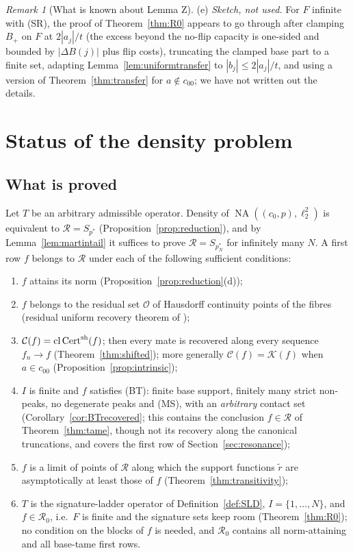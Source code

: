 \documentclass[10pt]{amsart}
\theoremstyle{definition}
\theoremstyle{remark}
\newtheorem{remark}[theorem]{Remark}
\newcommand{\NA}{\operatorname{NA}}
\newcommand{\Cset}{\mathcal C}
\newcommand{\Cert}{\operatorname{Cert}}
\newcommand{\cl}{\operatorname{cl}}
\newcommand{\Rec}{\mathcal R}
\begin{document}
\begin{remark}[What is known about Lemma Z]
(e) \emph{Sketch, not used.}  For $F$ infinite with (SR), the proof of
Theorem~\ref{thm:R0} appears to go through after clamping $B_+$ on $F$ at
$2|a_j|/t$ (the excess beyond the no-flip capacity is one-sided and bounded
by $|\Delta B(j)|$ plus flip costs), truncating the clamped base part to a
finite set, adapting Lemma~\ref{lem:uniformtransfer} to $|b_j|\le2|a_j|/t$,
and using a version of Theorem~\ref{thm:transfer} for $a\notin c_{00}$; we
have not written out the details.
\end{remark}

\section{Status of the density problem}\label{sec:status}

\subsection{What is proved}
Let $T$ be an arbitrary admissible operator.  Density of
$\NA((c_0,p),\ell_2^2)$ is equivalent to $\Rec=S_{p^*}$
(Proposition~\ref{prop:reduction}), and by Lemma~\ref{lem:martintail} it
suffices to prove $\Rec=S_{p_N^*}$ for infinitely many $N$.  A first row
$f$ belongs to $\Rec$ under each of the following sufficient conditions:
\begin{enumerate}
\item[(S1)] $f$ attains its norm (Proposition~\ref{prop:reduction}(d));
\item[(S2)] $f$ belongs to the residual set $\mathcal O$ of Hausdorff continuity
points of the fibres (residual uniform recovery theorem of \cite{PrA});
\item[(S3)] $\Cset(f)=\cl\Cert^{\rm sh}(f)$; then every mate is recovered
along every sequence $f_n\to f$ (Theorem~\ref{thm:shifted}); more generally
$\Cset(f)=\mathcal K(f)$ when $a\in c_{00}$ (Proposition~\ref{prop:intrinsic});
\item[(S4)] $I$ is finite and $f$ satisfies \textup{(BT)}: finite base support,
finitely many strict non-peaks, no degenerate peaks and \textup{(MS)}, with
an \emph{arbitrary} contact set (Corollary~\ref{cor:BTrecovered}; this
contains the conclusion $f\in\Rec$ of Theorem~\ref{thm:tame}, though not its
recovery along the canonical truncations, and covers the first row of
Section~\ref{sec:resonance});
\item[(S5)] $f$ is a limit of points of $\Rec$ along which the support
functions $\tilde r$ are asymptotically at least those of $f$
(Theorem~\ref{thm:transitivity});
\item[(S6)] $T$ is the signature-ladder operator of
Definition~\ref{def:SLD}, $I=\{1,\dots,N\}$, and $f\in\mathcal R_0$, i.e.\
$F$ is finite and the signature sets keep room (Theorem~\ref{thm:R0}); no
condition on the blocks of $f$ is needed, and $\mathcal R_0$ contains all
norm-attaining and all base-tame first rows.
\end{enumerate}
\end{document}
